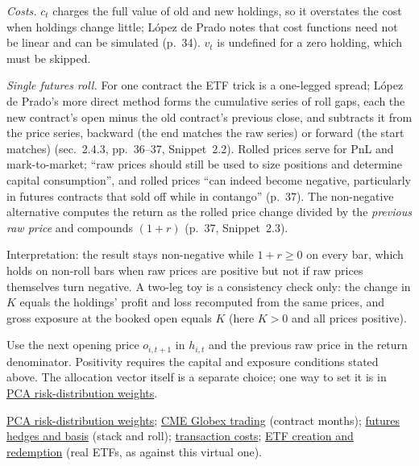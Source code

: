 \begin{qfmethod}
\emph{Costs.} $c_t$ charges the full value of old and new holdings, so it overstates the cost when holdings change little; López de Prado notes that cost functions need not be linear and can be simulated (p.~34). $v_t$ is undefined for a zero holding, which must be skipped.

 \emph{Single futures roll.} For one contract the ETF trick is a one-legged spread; López de Prado's more direct method forms the cumulative series of roll gaps, each the new contract's open minus the old contract's previous close, and subtracts it from the price series, backward (the end matches the raw series) or forward (the start matches) (sec.~2.4.3, pp.~36--37, Snippet~2.2). Rolled prices serve for PnL and mark-to-market; ``raw prices should still be used to size positions and determine capital consumption'', and rolled prices ``can indeed become negative, particularly in futures contracts that sold off while in contango'' (p.~37). The non-negative alternative computes the return as the rolled price change divided by the \emph{previous raw price} and compounds $(1+r)$ (p.~37, Snippet~2.3).

Interpretation: the result stays non-negative while $1+r\ge0$ on every bar, which holds on non-roll bars when raw prices are positive but not if raw prices themselves turn negative. A two-leg toy is a consistency check only: the change in $K$ equals the holdings' profit and loss recomputed from the same prices, and gross exposure at the booked open equals $K$ (here $K>0$ and all prices positive).

 Use the next opening price $o_{i,t+1}$ in $h_{i,t}$ and the previous raw price in the return denominator. Positivity requires the capital and exposure conditions stated above. The allocation vector itself is a separate choice; one way to set it is in \hyperref[mod:pca-risk-distribution-weights]{PCA risk-distribution weights}.

 \hyperref[mod:pca-risk-distribution-weights]{PCA risk-distribution weights}; \hyperref[conv:cme-globex-trading]{CME Globex trading} (contract months); \hyperref[def:futures-hedge-basis]{futures hedges and basis} (stack and roll); \hyperref[def:transaction-costs]{transaction costs}; \hyperref[mech:etf-creation-redemption]{ETF creation and redemption} (real ETFs, as against this virtual one).

\end{qfmethod}

